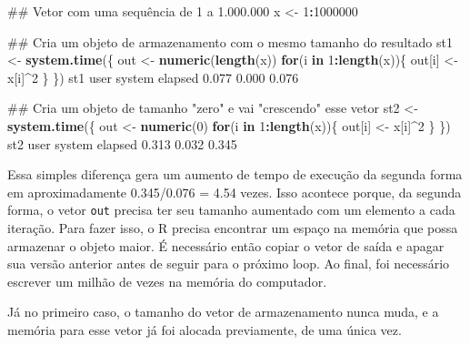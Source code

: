 \documentclass[10pt,a4paper]{book}
\newenvironment{Shaded}{\begin{snugshade}}{\end{snugshade}}
\newcommand{\KeywordTok}[1]{\textcolor[rgb]{0.13,0.29,0.53}{\textbf{#1}}}
\newcommand{\DecValTok}[1]{\textcolor[rgb]{0.00,0.00,0.81}{#1}}
\newcommand{\FloatTok}[1]{\textcolor[rgb]{0.00,0.00,0.81}{#1}}
\newcommand{\StringTok}[1]{\textcolor[rgb]{0.31,0.60,0.02}{#1}}
\newcommand{\ControlFlowTok}[1]{\textcolor[rgb]{0.13,0.29,0.53}{\textbf{#1}}}
\newcommand{\OperatorTok}[1]{\textcolor[rgb]{0.81,0.36,0.00}{\textbf{#1}}}
\newcommand{\NormalTok}[1]{#1}
\begin{document}
\begin{Shaded}
\begin{Highlighting}[]
\NormalTok{## Vetor com uma sequência de 1 a 1.000.000}
\NormalTok{x <-}\StringTok{ }\DecValTok{1}\OperatorTok{:}\DecValTok{1000000}

\NormalTok{## Cria um objeto de armazenamento com o mesmo tamanho do resultado}
\NormalTok{st1 <-}\StringTok{ }\KeywordTok{system.time}\NormalTok{(\{}
\NormalTok{    out <-}\StringTok{ }\KeywordTok{numeric}\NormalTok{(}\KeywordTok{length}\NormalTok{(x))}
    \ControlFlowTok{for}\NormalTok{(i }\ControlFlowTok{in} \DecValTok{1}\OperatorTok{:}\KeywordTok{length}\NormalTok{(x))\{}
\NormalTok{        out[i] <-}\StringTok{ }\NormalTok{x[i]}\OperatorTok{^}\DecValTok{2}
\NormalTok{    \}}
\NormalTok{\})}
\NormalTok{st1}
\NormalTok{   user  system elapsed }
  \FloatTok{0.077}   \FloatTok{0.000}   \FloatTok{0.076} 

\NormalTok{## Cria um objeto de tamanho "zero" e vai "crescendo" esse vetor}
\NormalTok{st2 <-}\StringTok{ }\KeywordTok{system.time}\NormalTok{(\{}
\NormalTok{    out <-}\StringTok{ }\KeywordTok{numeric}\NormalTok{(}\DecValTok{0}\NormalTok{)}
    \ControlFlowTok{for}\NormalTok{(i }\ControlFlowTok{in} \DecValTok{1}\OperatorTok{:}\KeywordTok{length}\NormalTok{(x))\{}
\NormalTok{        out[i] <-}\StringTok{ }\NormalTok{x[i]}\OperatorTok{^}\DecValTok{2}
\NormalTok{    \}}
\NormalTok{\})}
\NormalTok{st2}
\NormalTok{   user  system elapsed }
  \FloatTok{0.313}   \FloatTok{0.032}   \FloatTok{0.345} 
\end{Highlighting}
\end{Shaded}

Essa simples diferença gera um aumento de tempo de execução da segunda
forma em aproximadamente 0.345/0.076 = 4.54 vezes. Isso acontece porque,
da segunda forma, o vetor \texttt{out} precisa ter seu tamanho aumentado
com um elemento a cada iteração. Para fazer isso, o R precisa encontrar
um espaço na memória que possa armazenar o objeto maior. É necessário
então copiar o vetor de saída e apagar sua versão anterior antes de
seguir para o próximo loop. Ao final, foi necessário escrever um milhão
de vezes na memória do computador.

Já no primeiro caso, o tamanho do vetor de armazenamento nunca muda, e a
memória para esse vetor já foi alocada previamente, de uma única vez.
\end{document}
